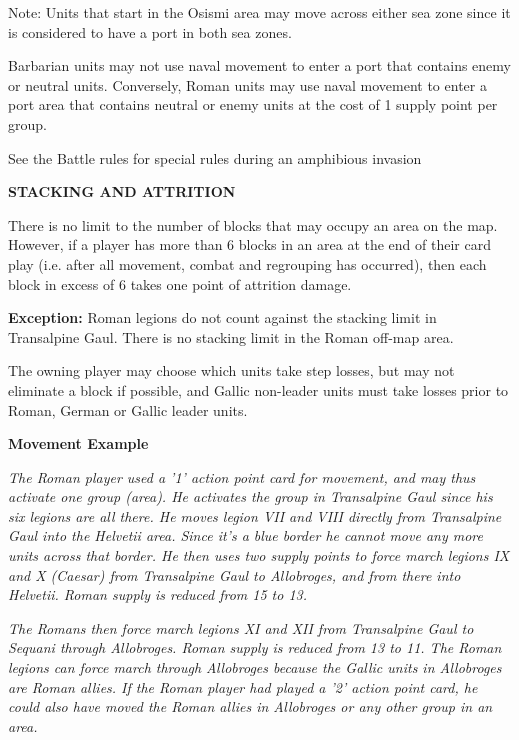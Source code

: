 Note: Units that start in the Osismi area may move across either sea zone since it is considered to have a port in both sea zones.

Barbarian units may not use naval movement to enter a port that contains enemy or neutral units. Conversely, Roman units may use naval movement to enter a port area that contains neutral or enemy units at the cost of 1 supply point per group.

See the Battle rules for special rules during an amphibious invasion

\textbf{STACKING AND ATTRITION}
\par
There is no limit to the number of blocks that may occupy an area on the map. However, if a player has more than 6 blocks in an area at the end of their card play (i.e. after all movement, combat and regrouping has occurred), then each block in excess of 6 takes one point of attrition damage.

\textbf{Exception:} Roman legions do not count against the stacking limit in Transalpine Gaul. There is no stacking limit in the Roman off-map area.

The owning player may choose which units take step losses, but may not eliminate a block if possible, and Gallic non-leader units must take losses prior to Roman, German or Gallic leader units.

\textbf{Movement Example}
\par
\textit{The Roman player used a '1' action point card for movement, and may thus activate one group (area). He activates the group in Transalpine Gaul since his six legions are all there. He moves legion VII and VIII directly from Transalpine Gaul into the Helvetii area. Since it's a blue border he cannot move any more units across that border. He then uses two supply points to force march legions IX and X (Caesar) from Transalpine Gaul to Allobroges, and from there into Helvetii. Roman supply is reduced from 15 to 13.}
\par
\textit{The Romans then force march legions XI and XII from Transalpine Gaul to Sequani through Allobroges. Roman supply is reduced from 13 to 11. The Roman legions can force march through Allobroges because the Gallic units in Allobroges are Roman allies. If the Roman player had played a '2' action point card, he could also have moved the Roman allies in Allobroges or any other group in an area.}
